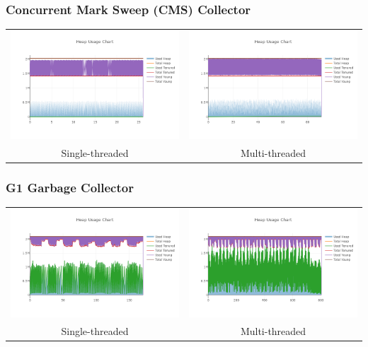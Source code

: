 \documentclass[11pt,a4paper]{article}
\begin{document}
\subsubsection{Concurrent Mark Sweep (CMS) Collector}
\begin{tabular}{ c c }
    \includegraphics[width=0.5\linewidth]{heap_single_conc.png}         & \includegraphics[width=0.5\linewidth]{heap_multi_conc.png} \\
    Single-threaded                                                     & Multi-threaded
\end{tabular}

\subsubsection{G1 Garbage Collector}
\begin{tabular}{ c c }
    \includegraphics[width=0.5\linewidth]{heap_single_g1.png}           & \includegraphics[width=0.5\linewidth]{heap_multi_g1.png} \\
    Single-threaded                                                     & Multi-threaded
\end{tabular}
\end{document}
